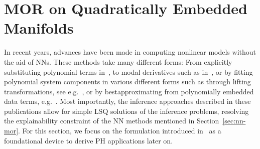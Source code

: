\section{MOR on Quadratically Embedded Manifolds}\label{sec:mor-quadratically-embedded-manifolds}

In recent years, advances have been made in computing nonlinear models without the aid of \acp{NN}.
These methods take many different forms: From explicitly substituting polynomial terms in~\cite{Gu2011}, to modal derivatives such as in~\cite{Wu2016, Weeger2016, Jain2017, Rutzmoser2017}, or by fitting polynomial system components in various different forms such as through lifting transformations, see e.g.~\cite{Kramer2019, Qian2022}, or by bestapproximating from polynomially embedded data terms, e.g.~\cite{Peherstorfer2016, BGK2020, Gosea2021, Barnett2022, Geelen2023}.
Most importantly, the inference approaches described in these publications allow for simple \ac{LSQ} solutions of the inference problems, resolving the explainability constraint of the \ac{NN} methods mentioned in Section~\ref{sec:nn-mor}.
For this section, we focus on the formulation introduced in~\cite{Geelen2023} as a foundational device to derive \ac{PH} applications later on.

